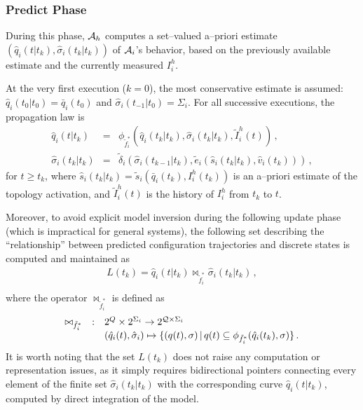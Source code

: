 \documentclass[journal, onecolumn, 12pt]{styles/IEEEtran}
\begin{document}
\subsubsection{Predict Phase} 

During this phase, $\mathcal{A}_h$ computes a set--valued a--priori estimate $(\hat{q}_i(t|t_k), \hat{\sigma}_i(t_k|t_k))$ of $\mathcal{A}_i$'s behavior, based on the previously available estimate and the currently measured $I_i^h$.

At the very first execution ($k=0$), the most conservative estimate is assumed: $\hat{q}_i(t_0 | t_0) = \bar{q}_i(t_0)$ and $\hat{\sigma}_i(t_{-1}|t_{0})=\Sigma_i$. For all successive executions, the propagation law is
$$
\begin{array}{rcl}
\hat{q}_i(t|t_{k}) & = & \phi_{\tilde{f}_i^*}(\hat{q}_i(t_{k}|t_k), \hat{\sigma}_i(t_{k} | t_{k}), \tilde{I}_i^h(t)) \, , \\
\hat{\sigma}_i(t_k|t_k)  & = & \tilde{\delta}_i(\hat{\sigma}_i(t_{k-1}|t_k), \tilde{e}_i(\hat{s}_i(t_k | t_k), \hat{v}_i(t_k))) \, ,
\end{array}
$$ 
for $t \geq t_k$, where $\hat{s}_i(t_{k}|t_{k}) = \tilde{s}_i(\bar{q}_i(t_{k}), I_i^h(t_{k})) $ is an a--priori estimate of the topology activation, and $\tilde{I}_i^h(t)$ is the history of $I_i^h$ from $t_k$ to $t$.

Moreover, to avoid explicit model inversion during the following update phase
(which is impractical for general systems), the following set describing the ``relationship'' between predicted configuration trajectories and discrete states is computed and maintained as
\begin{equation*}
\begin{array}{l}
L(t_k) = \hat{q}_i(t|t_{k}) \bowtie_{\tilde{f}_i^*} \hat{\sigma}_i(t_{k}|t_{k}) \, , \\
\end{array}
\end{equation*}
where the operator $\bowtie_{\tilde{f}^*_i}$ is defined as 
\begin{equation*}
\begin{array}{rcl}
\bowtie_{\tilde{f}^*_i} & : & 2^Q \times 2^{\Sigma_i} \rightarrow 2^{\mathcal{Q} \times \Sigma_i} \\
& & (\hat{q}_i(t), \hat{\sigma}_i) \mapsto \{(q(t), \sigma) \, | \, q(t) \subseteq \phi_{\tilde{f}^*_i}(\hat{q}_i(t_{k}), \sigma) \}
\, .
\end{array}
\end{equation*}
It is worth noting that the set $L(t_k)$ does not raise any computation or representation issues, as it simply requires bidirectional pointers connecting every element of the finite set $\hat{\sigma}_i(t_{k}|t_{k})$ with the corresponding curve $\hat{q}_i(t|t_{k})$, computed by direct integration of the model.
\end{document}
